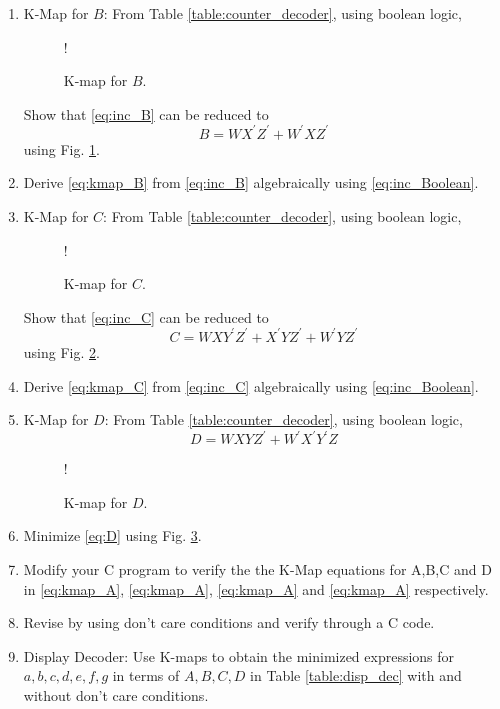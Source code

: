 \begin{enumerate}[label=\thesection.\arabic*.,ref=\thesection.\theenumi]
\item K-Map for $B$:
From Table \ref{table:counter_decoder}, using boolean logic,
%
\begin{figure}[!h]
\resizebox {\columnwidth} {!} {

}
\caption{K-map for $B$.}
\label{fig:kmap_B}
\end{figure}
%
Show that \eqref{eq:inc_B} can be reduced to
\begin{equation}
\label{eq:kmap_B}
B = WX^{\prime}Z^{\prime} + W^{\prime}XZ^{\prime}
\end{equation}
using Fig. \ref{fig:kmap_B}.
\item Derive \eqref{eq:kmap_B} from \eqref{eq:inc_B} algebraically using \eqref{eq:inc_Boolean}.
%
%
\item {K-Map for $C$: }
From Table \ref{table:counter_decoder}, using boolean logic,
%
%
\begin{figure}[!h]
\resizebox {\columnwidth} {!} {

}
\caption{K-map for $C$.}
\label{fig:kmap_C}
\end{figure}
%
Show that \eqref{eq:inc_C} can be reduced to
\begin{equation}
\label{eq:kmap_C}
C = WXY^{\prime}Z^{\prime}  +  X^{\prime}YZ^{\prime} + W^{\prime}YZ^{\prime}
\end{equation}
using Fig. \ref{fig:kmap_C}.
%
\item 
Derive \eqref{eq:kmap_C} from \eqref{eq:inc_C} algebraically using \eqref{eq:inc_Boolean}.
%
\item {K-Map for $D$: }
From Table \ref{table:counter_decoder}, using boolean logic,
\begin{equation}
\label{eq:D}
D = WXYZ^{\prime} + W^{\prime}X^{\prime}Y^{\prime}Z
\end{equation}
%
\begin{figure}[!h]
\resizebox {\columnwidth} {!} {

}
\caption{K-map for $D$.}
\label{fig:kmap_D}
\end{figure}
%
\item 
Minimize \eqref{eq:D} using Fig. \ref{fig:kmap_D}.
%
\item Modify your C program to verify the 
%
the K-Map equations for A,B,C and D in \eqref{eq:kmap_A}, \eqref{eq:kmap_A}, \eqref{eq:kmap_A}
and \eqref{eq:kmap_A} respectively.
\item Revise by using don't care conditions and verify through a C code.
\item {Display Decoder:}
Use K-maps to obtain the minimized expressions for $a,b,c,d,e,f,g$ in terms of $A,B,C,D$ in Table \ref{table:disp_dec} 
with and without don't care conditions.
%
\end{enumerate}
%
%
